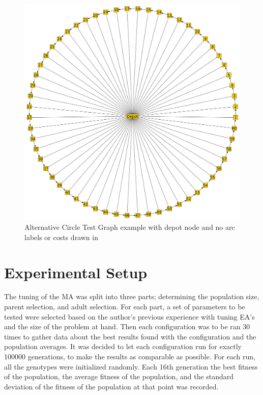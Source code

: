 \begin{figure}[thbp]
    \centerline{\includegraphics[width=\textwidth]{figures/CircleTests/CircleTestIllustrations/Circle_Test_Graph_Central_Depot-No_arc_or_edge_labels_or_costs.pdf}}
    \caption{Alternative Circle Test Graph example with depot node and no arc labels or costs drawn in}
    \label{fig:ctgcdnaoeloc}
\end{figure}



\clearpage

\section{Experimental Setup} %
\label{sec:experimental_setup}
The tuning of the MA was split into three parts; determining the population size, parent selection, and adult selection. 
For each part, a set of parameters to be tested were selected based on the author's previous experience with tuning EA's and the size of the problem at hand. Then each configuration was to be ran 30 times to gather data about the best results found with the configuration and the population averages. It was decided to let each configuration run for exactly 100000 generations, to make the results as comparable as possible. For each run, all the genotypes were initialized randomly.  Each 16th generation the best fitness of the population, the average fitness of the population, and the standard deviation of the fitness of the population at that point was recorded.

